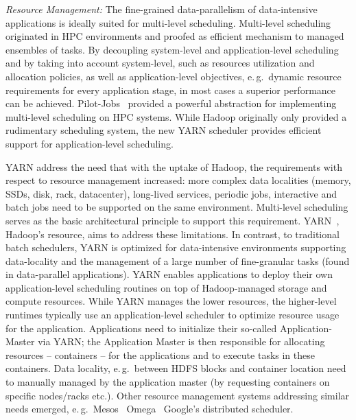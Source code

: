 \documentclass{sig-alternate}
\newcommand{\pilotjobs}{Pilot-Jobs\xspace}
\begin{document}
\emph{Resource Management:} The fine-grained data-parallelism of data-intensive
applications is ideally suited for multi-level scheduling. Multi-level
scheduling~\cite{1392910} originated in HPC environments and proofed as
efficient mechanism to managed ensembles of tasks. By decoupling system-level
and application-level scheduling and by taking into account system-level, such
as resources utilization and allocation policies, as well as application-level
objectives, e.\,g.\ dynamic resource requirements for every application stage,
in most cases a superior performance can be achieved. \pilotjobs~\cite{pstar12}
provided a powerful abstraction for implementing multi-level scheduling on HPC
systems. While Hadoop originally only provided a rudimentary scheduling system,
the new YARN scheduler provides efficient support for application-level
scheduling.

YARN address the need that with the uptake of Hadoop, the requirements with
respect to resource management increased: more complex data localities (memory,
SSDs, disk, rack, datacenter), long-lived services, periodic jobs, interactive
and batch jobs need to be supported on the same environment. Multi-level
scheduling serves as the basic architectural principle to support this
requirement. YARN~\cite{yarn-paper}, Hadoop's resource, aims to address these
limitations. In contrast, to traditional batch schedulers, YARN is optimized
for data-intensive environments supporting data-locality and the management of
a large number of fine-granular tasks (found in data-parallel applications).
YARN enables applications to deploy their own application-level scheduling
routines on top of Hadoop-managed storage and compute resources. While YARN
manages the lower resources, the higher-level runtimes typically use an
application-level scheduler to optimize resource usage for the application.
Applications need to initialize their so-called Application-Master via YARN;
the Application Master is then responsible for allocating resources --
containers -- for the applications and to execute tasks in these containers.
Data locality, e.\,g.\ between HDFS blocks and container location need to
manually managed by the application master (by requesting containers on
specific nodes/racks etc.). Other resource management systems addressing
similar needs emerged, e.\,g.\ Mesos~\cite{Hindman:2011:MPF:1972457.1972488}
Omega~\cite{omega} Google's distributed scheduler.
\end{document}
